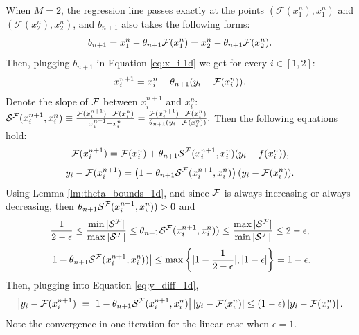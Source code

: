 \documentclass[nohyperref]{article}
\begin{document}
When $M=2$, the regression line passes exactly at the points $(\mathcal{F}(x^n_1), x^n_1)$ and $(\mathcal{F}(x^n_2), x^n_2)$, and $b_{n+1}$ also takes the following forms:
\begin{align*}
    b_{n+1}=x^n_1-\theta_{n+1}\mathcal{F}(x^n_1)=x^n_2-\theta_{n+1}\mathcal{F}(x^n_2).
\end{align*}
Then, plugging $b_{n+1}$ in Equation \ref{eq:x_i-1d} we get for every $i\in[1,2]$:
\begin{align*}
    x_i^{n+1}=x_i^n+\theta_{n+1}(y_i-\mathcal{F}(x_i^n)).
\end{align*}
Denote the slope of $\mathcal{F}$ between $x_i^{n+1}$ and $x_i^n$: $\mathcal{S}^{\mathcal{F}}(x^{n+1}_i,x_i^n)\equiv\frac{\mathcal{F}(x_i^{n+1})-\mathcal{F}(x_i^n)}{x_i^{n+1}-x_i^n}=\frac{\mathcal{F}(x_i^{n+1})-\mathcal{F}(x_i^n)}{\theta_{n+1}(y_i-\mathcal{F}(x_i^n))}.
$
Then the following equations hold:
\begin{align*}
    \mathcal{F}(x_i^{n+1})=\mathcal{F}(x_i^n)+\theta_{n+1}\mathcal{S}^{\mathcal{F}}(x_i^{n+1},x_i^n) (y_i-f(x_i^n)),
\end{align*}
\begin{equation}\label{eq:y_diff_1d}
    y_i - \mathcal{F}(x_i^{n+1})=\left(1-\theta_{n+1}\mathcal{S}^{\mathcal{F}}(x_i^{n+1},x_i^n) \right)(y_i-\mathcal{F}(x_i^n)).
\end{equation}
Using Lemma \ref{lm:theta_bounds_1d}, and since $\mathcal{F}$ is always increasing or always decreasing, then $\theta_{n+1} \mathcal{S}^{\mathcal{F}}(x_i^{n+1},x_i^n))>0$ and
\begin{align*}
   \frac{1}{2-\epsilon} \leq \frac{\min |\mathcal{S}^{\mathcal{F}}|}{\max |\mathcal{S}^{\mathcal{F}}|}\leq \theta_{n+1} \mathcal{S}^{\mathcal{F}}(x_i^{n+1},x_i^n)) \leq \frac{\max |\mathcal{S}^{\mathcal{F}}|}{\min |\mathcal{S}^{\mathcal{F}}|}\leq 2-\epsilon ,
\end{align*}
\begin{equation}\label{eq:gamma_bound}
    \left| 1- \theta_{n+1} \mathcal{S}^{\mathcal{F}}(x_i^{n+1},x_i^n)) \right| \leq \max \left\{ |1-\frac{1}{2-\epsilon}|, |1-\epsilon |\right\}=1-\epsilon.
\end{equation}
Then, plugging into Equation \ref{eq:y_diff_1d},
\begin{align*}
        \left| y_i - \mathcal{F}(x_i^{n+1}) \right| =  \left|1-\theta_{n+1}\mathcal{S}^{\mathcal{F}}(x_i^{n+1},x_i^n) \right| \left|y_i-\mathcal{F}(x_i^n)\right| \leq (1-\epsilon) \left| y_i - \mathcal{F}(x_i^n) \right|.
\end{align*}
Note the convergence in one iteration for the linear case when $\epsilon=1$.
\end{document}
